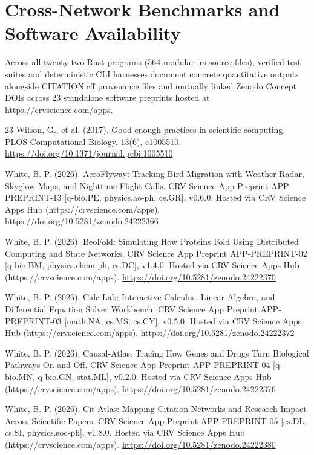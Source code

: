 \documentclass[10pt,letterpaper]{article}
\begin{document}
\section{Cross-Network Benchmarks and Software Availability}
Across all twenty-two Rust programs (564 modular .rs source files), verified test suites and deterministic CLI harnesses document concrete quantitative outputs alongside CITATION.cff provenance files and mutually linked Zenodo Concept DOIs across 23 standalone software preprints hosted at https://crvscience.com/apps.

\begin{thebibliography}{23}
 Wilson, G., et al. (2017). Good enough practices in scientific computing. PLOS Computational Biology, 13(6), e1005510. \url{https://doi.org/10.1371/journal.pcbi.1005510}

 White, B. P. (2026). AeroFlyway: Tracking Bird Migration with Weather Radar, Skyglow Maps, and Nighttime Flight Calls. CRV Science App Preprint APP-PREPRINT-13 [q-bio.PE, physics.ao-ph, cs.GR], v0.6.0. Hosted via CRV Science Apps Hub (https://crvscience.com/apps). \url{https://doi.org/10.5281/zenodo.24222366}

 White, B. P. (2026). BeoFold: Simulating How Proteins Fold Using Distributed Computing and State Networks. CRV Science App Preprint APP-PREPRINT-02 [q-bio.BM, physics.chem-ph, cs.DC], v1.4.0. Hosted via CRV Science Apps Hub (https://crvscience.com/apps). \url{https://doi.org/10.5281/zenodo.24222370}

 White, B. P. (2026). Calc-Lab: Interactive Calculus, Linear Algebra, and Differential Equation Solver Workbench. CRV Science App Preprint APP-PREPRINT-03 [math.NA, cs.MS, cs.CY], v0.5.0. Hosted via CRV Science Apps Hub (https://crvscience.com/apps). \url{https://doi.org/10.5281/zenodo.24222372}

 White, B. P. (2026). Causal-Atlas: Tracing How Genes and Drugs Turn Biological Pathways On and Off. CRV Science App Preprint APP-PREPRINT-04 [q-bio.MN, q-bio.GN, stat.ML], v0.2.0. Hosted via CRV Science Apps Hub (https://crvscience.com/apps). \url{https://doi.org/10.5281/zenodo.24222376}

 White, B. P. (2026). Cit-Atlas: Mapping Citation Networks and Research Impact Across Scientific Papers. CRV Science App Preprint APP-PREPRINT-05 [cs.DL, cs.SI, physics.soc-ph], v1.8.0. Hosted via CRV Science Apps Hub (https://crvscience.com/apps). \url{https://doi.org/10.5281/zenodo.24222380}


\end{thebibliography}
\end{document}
